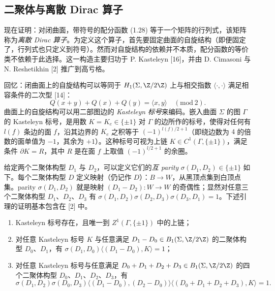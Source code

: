 \subsection{二聚体与离散 Dirac 算子}

现在证明：对闭曲面，带符号的配分函数 (1.28) 等于一个矩阵的行列式，该矩阵称为\emph{离散 Dirac 算子}。为定义这个算子，首先要固定曲面的自旋结构（即便固定了，行列式也只定义到符号）。然而对自旋结构的依赖并不本质，配分函数的等价类不依赖于此选择。这一构造主要归功于 P. Kasteleyn [16]，并由 D. Cimasoni 与 N. Reshetikhin [2] 推广到高亏格。

回忆：闭曲面上的自旋结构可以等同于 $H_1(\Sigma,\Z/2\Z)$ 上与相交指数 $\langle\cdot,\cdot\rangle$ 满足相容条件的二次型 [14]：
\begin{equation}\label{eq:1.29}
Q(x+y)+Q(x)+Q(y)=\langle x,y\rangle\quad(\mathrm{mod}\ 2).
\tag{1.29}
\end{equation}
曲面上的自旋结构可以用二部图边的 \emph{Kasteleyn 标号}来编码。嵌入曲面 $\Sigma$ 的图 $\Gamma$ 的 Kasteleyn 标号，是用数 $K=K_e\in\{\pm1\}$ 对 $\Gamma$ 的边所作的标号，使得对任何有 $l(f)$ 条边的面 $f$，沿其边界的 $K_e$ 之积等于 $(-1)^{l(f)/2+1}$（即绕边数为 $4$ 的倍数的面单值为 $-1$，其余为 $+1$）。这种标号可视为上链 $K\in C^1(\Gamma,\{\pm1\})$，满足条件 $\partial K=R$，其中 $R$ 是在面 $f$ 上取值 $(-1)^{l/2+1}$ 的余圈。

给定两个二聚体构型 $D_1$ 与 $D_2$，可以定义它们的\emph{互 parity} $\sigma(D_1,D_2)\in\{\pm1\}$ 如下。每个二聚体构型 $D$ 定义映射（仍记作 $D$）：$B\to W$，从黑顶点集到白顶点集。parity $\sigma(D_1,D_2)$ 就是映射 $(D_1-D_2): W\to W$ 的奇偶性；显然对任意三个二聚体构型 $D_1$、$D_2$、$D_3$ 有 $\sigma(D_1,D_2)\sigma(D_2,D_3)\sigma(D_3,D_1)=1$。下述引理的证明基本包含在 [2] 中。

\begin{lemma}\label{lem:1.5.4}
\begin{enumerate}[label=(\roman*), leftmargin=2.2em, itemsep=0.15em]
\item Kasteleyn 标号存在，且唯一到 $Z^1(\Gamma,\{\pm1\})$ 中的上链；
\item 对任意 Kasteleyn 标号 $K$ 与任意满足 $D_1-D_0\in B_1(\Sigma,\Z/2\Z)$ 的二聚体构型 $D_0$、$D_1$，有 $\sigma(D_1,D_0)\langle(D_1-D_0),K\rangle=1$；
\item 对任意 Kasteleyn 标号与任意满足 $D_0+D_1+D_2+D_3\in B_1(\Sigma,\Z/2\Z)$ 的四个二聚体构型 $D_0$、$D_1$、$D_2$、$D_3$，有
\[
\sigma(D_1,D_2)\sigma(D_0,D_3)\langle(D_1-D_0),(D_2-D_0)\rangle\langle(D_0+D_1+D_2+D_3),K\rangle=1.
\]
\end{enumerate}
\end{lemma}


